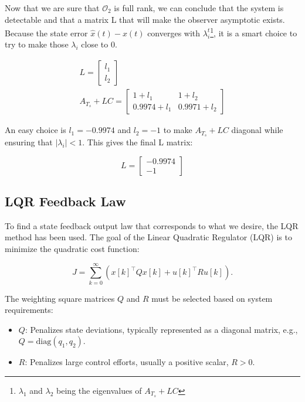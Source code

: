 Now that we are sure that $\mathcal{O}_2$ is full rank, we can conclude that the system is detectable and that a matrix
L that will make the observer asymptotic exists. Because the state error $\hat{x}(t) - x(t)$ converges with 
$\lambda_i^t$\footnote{$\lambda_1$ and $\lambda_2$ being the eigenvalues of $A_{T_s} + LC$}, it is a smart choice to try to make
those $\lambda_i$ close to 0.

\begin{gather}
    L = \begin{bmatrix} l_1\\l_2 \end{bmatrix}\\
    A_{T_s} + L C = \begin{bmatrix} 1+l_1 & 1+l_2 \\ 0.9974+l_1 & 0.9971+l_2 \end{bmatrix}
\end{gather}

An easy choice is $l_1 = -0.9974$ and $l_2 = -1$ to make $A_{T_s} + LC$ diagonal while ensuring that $\left|\lambda_i
\right| < 1$. This gives the final L matrix:

\begin{equation}
    L = \begin{bmatrix}
        -0.9974 \\ -1
    \end{bmatrix}
\end{equation}


\subsection{LQR Feedback Law}

To find a state feedback output law that corresponds to what we desire, the LQR method has been used.
The goal of the Linear Quadratic Regulator (LQR) is to minimize the quadratic cost function:

\[
J = \sum_{k=0}^\infty \left( x[k]^\top Q x[k] + u[k]^\top R u[k] \right).
\]

The weighting square matrices \( Q \) and \( R \) must be selected based on system requirements:

\begin{itemize}
    \item \( Q \): Penalizes state deviations, typically represented as a diagonal matrix, e.g., \( Q = \text{diag}(q_1, q_2) \).
    \item \( R \): Penalizes large control efforts, usually a positive scalar, \( R > 0 \).
\end{itemize}

